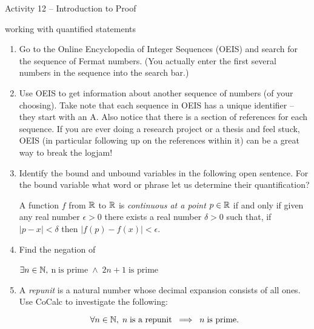 \documentclass{amsart}
\begin{document}
\thispagestyle{empty}

\centerline{\Large Activity 12 -- Introduction to Proof}
\centerline{\large working with quantified statements}

\bigskip
\Large


\begin{enumerate}

\item Go to the Online Encyclopedia of Integer Sequences (OEIS) and search for the sequence of Fermat numbers. (You actually enter the first several numbers in the sequence into the search bar.)

\vspace{.5in}

\item Use OEIS to get information about another sequence of numbers (of your choosing).  Take note that each sequence in OEIS has a unique identifier -- they start with an A.  Also notice that there is a section of references for each sequence. If you are ever doing a research project or a thesis and feel stuck, OEIS (in particular following up on the references within it) can be a great way to break the logjam!

\vspace{.5in}

\item Identify the bound and unbound variables in the following open sentence. For the bound variable what word or phrase let us determine their quantification?

A function $f$ from ${\mathbb R}$ to ${\mathbb R}$ is {\em continuous at a point} $p \in {\mathbb R}$ if and only if given any real number $\epsilon > 0$ there exists a real number $\delta > 0$ such that, if $|p - x| < \delta$ then $|f(p) - f(x)| < \epsilon$.

\vspace{.5in}

\item Find the negation of 

$\exists n \in {\mathbb N}, \; $n$ \; \mbox{is prime} \; \land \; 2n+1 \; \mbox{is prime}$

\vspace{.5in}

\item A {\em repunit} is a natural number whose decimal expansion consists of all ones.  Use CoCalc to investigate the following:

\[ \forall n \in {\mathbb N}, \; n \; \mbox{is a repunit} \; \implies \; n \; \mbox{is prime.} \]


\end{enumerate}
\end{document}
